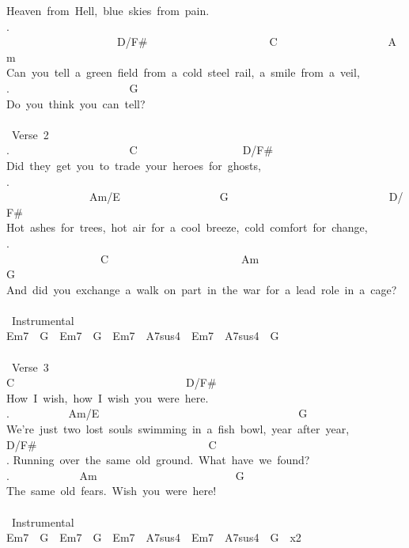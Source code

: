 {Heaven\ from\ Hell,\ blue\ skies\ from\ pain.\\
. \ \ \ \ \ \ \ \ \ \ \ \ \ \ \ \ \ \ \ \ D/F\#\ \ \ \ \ \ \ \ \ \ \ \ \ \ \ \ \ \ \ \ \ \ C\ \ \ \ \ \ \ \ \ \ \ \ \ \ \ \ \ \ \ \ Am\\
Can\ you\ tell\ a\ green\ field\ from\ a\ cold\ steel\ rail,\ a\ smile\ from\ a\ veil,\\
. \ \ \ \ \ \ \ \ \ \ \ \ \ \ \ \ \ \ \ \ \ G\\
Do\ you\ think\ you\ can\ tell?\\
\\
\lbrack\ Verse\ 2\rbrack\\
. \ \ \ \ \ \ \ \ \ \ \ \ \ \ \ \ \ \ \ \ \ C\ \ \ \ \ \ \ \ \ \ \ \ \ \ \ \ \ \ \ D/F\#\\
Did\ they\ get\ you\ to\ trade\ your\ heroes\ for\ ghosts,\\
. \ \ \ \ \ \ \ \ \ \ \ \ \ \ \ Am/E\ \ \ \ \ \ \ \ \ \ \ \ \ \ \ \ \ \ G\ \ \ \ \ \ \ \ \ \ \ \ \ \ \ \ \ \ \ \ \ \ \ \ \ \ \ \ \ D/F\#\\
Hot\ ashes\ for\ trees,\ hot\ air\ for\ a\ cool\ breeze,\ cold\ comfort\ for\ change,\\
. \ \ \ \ \ \ \ \ \ \ \ \ \ \ \ \ \ C\ \ \ \ \ \ \ \ \ \ \ \ \ \ \ \ \ \ \ \ \ \ \ \ Am\ \ \ \ \ \ \ \ \ \ \ \ \ \ \ \ \ \ \ \ \ \ \ \ \ G\\
And\ did\ you\ exchange\ a\ walk\ on\ part\ in\ the\ war\ for\ a\ lead\ role\ in\ a\ cage?\\
\\
\lbrack\ Instrumental\rbrack\\
Em7\ \ G\ \ Em7\ \ G\ \ Em7\ \ A7sus4\ \ Em7\ \ A7sus4\ \ G\\
\\
\lbrack\ Verse\ 3\rbrack\\
C\ \ \ \ \ \ \ \ \ \ \ \ \ \ \ \ \ \ \ \ \ \ \ \ \ \ \ \ \ \ \ D/F\#\\
How\ I\ wish,\ how\ I\ wish\ you\ were\ here.\\
. \ \ \ \ \ \ \ \ \ \ Am/E\ \ \ \ \ \ \ \ \ \ \ \ \ \ \ \ \ \ \ \ \ \ \ \ \ \ \ \ \ \ \ \ \ \ \ \ G\ \ \ \ \ \ \ \ \ \ \ \ \ \ \ \ \\
We're\ just\ two\ lost\ souls\ swimming\ in\ a\ fish\ bowl,\ year\ after\ year,\\
D/F\#\ \ \ \ \ \ \ \ \ \ \ \ \ \ \ \ \ \ \ \ \ \ \ \ \ \ \ \ \ \ \ C\\
. Running\ over\ the\ same\ old\ ground.\ What\ have\ we\ found?\\
. \ \ \ \ \ \ \ \ \ \ \ \ Am\ \ \ \ \ \ \ \ \ \ \ \ \ \ \ \ \ \ \ \ \ \ \ \ \ G\\
The\ same\ old\ fears.\ Wish\ you\ were\ here!\\
\\
\lbrack\ Instrumental\rbrack\\
Em7\ \ G\ \ Em7\ \ G\ \ Em7\ \ A7sus4\ \ Em7\ \ A7sus4\ \ G\ \ x2\ }
